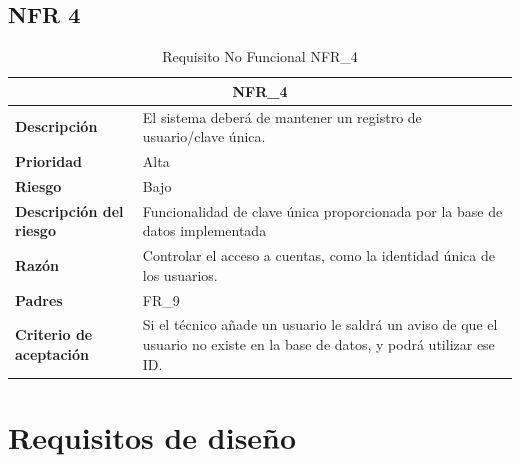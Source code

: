 \documentclass{scrreprt}
\begin{document}
\subsection{NFR 4}
    \begin{table}[H]
        \label{tab:my-table}
        \begin{tabular}{|p{5cm}|p{11cm}|}
        \hline
        \multicolumn{2}{|c|}{\textbf{NFR_4}} \\
        \hline
        \textbf{Descripción  }                      &  El sistema deberá de mantener un registro de usuario/clave única.                                                                    \\ \hline
        \textbf{Prioridad}                          & Alta                                                                                              \\ \hline
        \textbf{Riesgo}                          & Bajo                                                                                                \\ \hline
        \textbf{Descripción del riesgo}                    &  Funcionalidad de clave única proporcionada por la base de datos implementada                          \\ \hline
        \textbf{Razón}                   & Controlar el acceso a cuentas, como la identidad única de los usuarios.                                                                                         \\ \hline
        \textbf{Padres}                               &  FR_9\\  \hline
         \textbf{Criterio de aceptación}                    & Si el técnico añade un usuario le saldrá un aviso de que el usuario no existe en la base de datos, y podrá utilizar ese ID.  \\ \hline
        \end{tabular}%
        
        \caption{Requisito No Funcional NFR_4}
\end{table}

\section{Requisitos de diseño}
\end{document}

